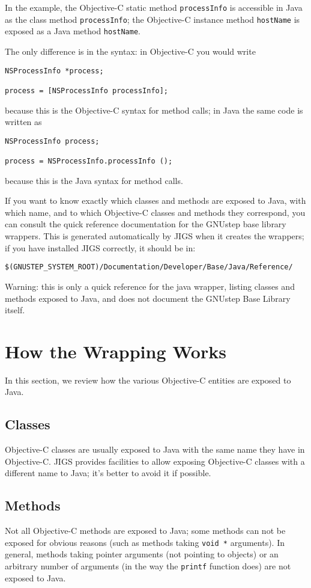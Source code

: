 In the example, the Objective-C static method \texttt{processInfo} is
accessible in Java as the class method \texttt{processInfo}; the
Objective-C instance method \texttt{hostName} is exposed as a Java
method \texttt{hostName}.

The only difference is in the syntax: in Objective-C you would write
\begin{verbatim}
NSProcessInfo *process;

process = [NSProcessInfo processInfo];
\end{verbatim}
because this is the Objective-C syntax for method calls; in Java the 
same code is written as 
\begin{verbatim}
NSProcessInfo process;

process = NSProcessInfo.processInfo ();
\end{verbatim}
because this is the Java syntax for method calls.

If you want to know exactly which classes and methods are exposed to
Java, with which name, and to which Objective-C classes and methods
they correspond, you can consult the quick reference documentation for
the GNUstep base library wrappers.  This is generated automatically by
JIGS when it creates the wrappers; if you have installed JIGS
correctly, it should be in:
\begin{verbatim}
$(GNUSTEP_SYSTEM_ROOT)/Documentation/Developer/Base/Java/Reference/
\end{verbatim}%
Warning: this is only a quick reference for the java wrapper, listing
classes and methods exposed to Java, and does not document the GNUstep
Base Library itself.

\section{How the Wrapping Works}

In this section, we review how the various Objective-C entities are
exposed to Java.

\subsection{Classes}
Objective-C classes are usually exposed to Java with the same name
they have in Objective-C.  JIGS provides facilities to allow exposing
Objective-C classes with a different name to Java; it's better to
avoid it if possible.

\subsection{Methods}
Not all Objective-C methods are exposed to Java; some methods can not
be exposed for obvious reasons (such as methods taking \texttt{void *}
arguments).  In general, methods taking pointer arguments (not
pointing to objects) or an arbitrary number of arguments (in the way 
the \texttt{printf} function does) are not exposed to Java.


